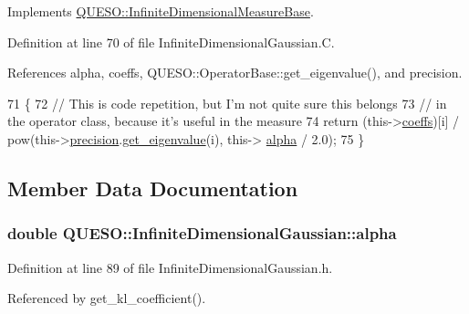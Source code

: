 Implements \hyperlink{class_q_u_e_s_o_1_1_infinite_dimensional_measure_base_a85c57f9eb7cfec24122f8fb856066d25}{Q\-U\-E\-S\-O\-::\-Infinite\-Dimensional\-Measure\-Base}.



Definition at line 70 of file Infinite\-Dimensional\-Gaussian.\-C.



References alpha, coeffs, Q\-U\-E\-S\-O\-::\-Operator\-Base\-::get\-\_\-eigenvalue(), and precision.


\begin{DoxyCode}
71 \{
72   \textcolor{comment}{// This is code repetition, but I'm not quite sure this belongs}
73   \textcolor{comment}{// in the operator class, because it's useful in the measure}
74   \textcolor{keywordflow}{return} (this->\hyperlink{class_q_u_e_s_o_1_1_infinite_dimensional_gaussian_abf9b3d144b4804414f328fa3ccca924a}{coeffs})[i] / pow(this->\hyperlink{class_q_u_e_s_o_1_1_infinite_dimensional_gaussian_af08c847ce01c948b60f72be309c60b37}{precision}.\hyperlink{class_q_u_e_s_o_1_1_operator_base_ae16245b5e46e01ff81121cca14190e7f}{get\_eigenvalue}(i), this->
      \hyperlink{class_q_u_e_s_o_1_1_infinite_dimensional_gaussian_ab3d6cf41482750591ccd8bbe2426a98d}{alpha} / 2.0);
75 \}
\end{DoxyCode}


\subsection{Member Data Documentation}
\hypertarget{class_q_u_e_s_o_1_1_infinite_dimensional_gaussian_ab3d6cf41482750591ccd8bbe2426a98d}{
\subsubsection[{alpha}]{\setlength{\rightskip}{0pt plus 5cm}double Q\-U\-E\-S\-O\-::\-Infinite\-Dimensional\-Gaussian\-::alpha\hspace{0.3cm}{\ttfamily [private]}}}\label{class_q_u_e_s_o_1_1_infinite_dimensional_gaussian_ab3d6cf41482750591ccd8bbe2426a98d}


Definition at line 89 of file Infinite\-Dimensional\-Gaussian.\-h.



Referenced by get\-\_\-kl\-\_\-coefficient().

